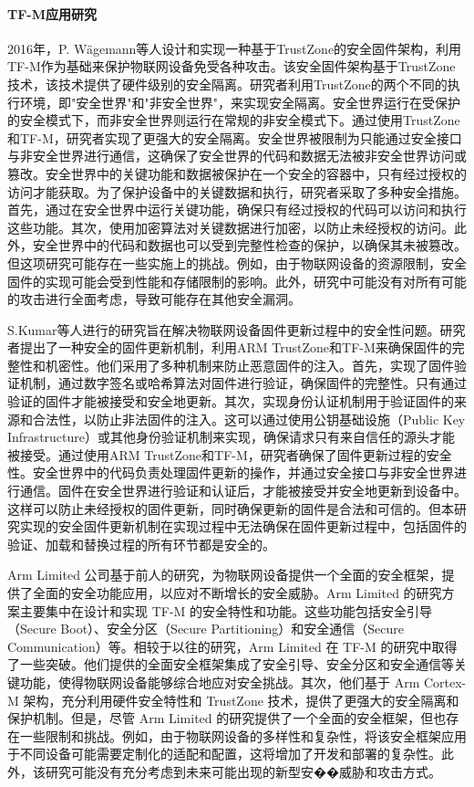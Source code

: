 \documentclass[UTF8,12pt,a4paper]{ctexart}
\numberwithin{figure}{section}
\begin{document}
\paragraph{TF-M应用研究}
\par 2016年，P. Wägemann等人\cite{trustzone-firmware}设计和实现一种基于TrustZone的安全固件架构，利用TF-M作为基础来保护物联网设备免受各种攻击。该安全固件架构基于TrustZone技术，该技术提供了硬件级别的安全隔离。研究者利用TrustZone的两个不同的执行环境，即"安全世界"和"非安全世界"，来实现安全隔离。安全世界运行在受保护的安全模式下，而非安全世界则运行在常规的非安全模式下。通过使用TrustZone和TF-M，研究者实现了更强大的安全隔离。安全世界被限制为只能通过安全接口与非安全世界进行通信，这确保了安全世界的代码和数据无法被非安全世界访问或篡改。安全世界中的关键功能和数据被保护在一个安全的容器中，只有经过授权的访问才能获取。为了保护设备中的关键数据和执行，研究者采取了多种安全措施。首先，通过在安全世界中运行关键功能，确保只有经过授权的代码可以访问和执行这些功能。其次，使用加密算法对关键数据进行加密，以防止未经授权的访问。此外，安全世界中的代码和数据也可以受到完整性检查的保护，以确保其未被篡改。但这项研究可能存在一些实施上的挑战。例如，由于物联网设备的资源限制，安全固件的实现可能会受到性能和存储限制的影响。此外，研究中可能没有对所有可能的攻击进行全面考虑，导致可能存在其他安全漏洞。
\par S.Kumar等人进行的研究\cite{secure-firmware-updates}旨在解决物联网设备固件更新过程中的安全性问题。研究者提出了一种安全的固件更新机制，利用ARM TrustZone和TF-M来确保固件的完整性和机密性。他们采用了多种机制来防止恶意固件的注入。首先，实现了固件验证机制，通过数字签名或哈希算法对固件进行验证，确保固件的完整性。只有通过验证的固件才能被接受和安全地更新。其次，实现身份认证机制用于验证固件的来源和合法性，以防止非法固件的注入。这可以通过使用公钥基础设施（Public Key Infrastructure）或其他身份验证机制来实现，确保请求只有来自信任的源头才能被接受。通过使用ARM TrustZone和TF-M，研究者确保了固件更新过程的安全性。安全世界中的代码负责处理固件更新的操作，并通过安全接口与非安全世界进行通信。固件在安全世界进行验证和认证后，才能被接受并安全地更新到设备中。这样可以防止未经授权的固件更新，同时确保更新的固件是合法和可信的。但本研究实现的安全固件更新机制在实现过程中无法确保在固件更新过程中，包括固件的验证、加载和替换过程的所有环节都是安全的。
\par  Arm Limited 公司\cite{trusted-firmware}基于前人的研究，为物联网设备提供一个全面的安全框架，提供了全面的安全功能应用，以应对不断增长的安全威胁。Arm Limited 的研究方案主要集中在设计和实现 TF-M 的安全特性和功能。这些功能包括安全引导（Secure Boot）、安全分区（Secure Partitioning）和安全通信（Secure Communication）等。相较于以往的研究，Arm Limited 在 TF-M 的研究中取得了一些突破。他们提供的全面安全框架集成了安全引导、安全分区和安全通信等关键功能，使得物联网设备能够综合地应对安全挑战。其次，他们基于 Arm Cortex-M 架构，充分利用硬件安全特性和 TrustZone 技术，提供了更强大的安全隔离和保护机制。但是，尽管 Arm Limited 的研究提供了一个全面的安全框架，但也存在一些限制和挑战。例如，由于物联网设备的多样性和复杂性，将该安全框架应用于不同设备可能需要定制化的适配和配置，这将增加了开发和部署的复杂性。此外，该研究可能没有充分考虑到未来可能出现的新型安��威胁和攻击方式。
\end{document}
